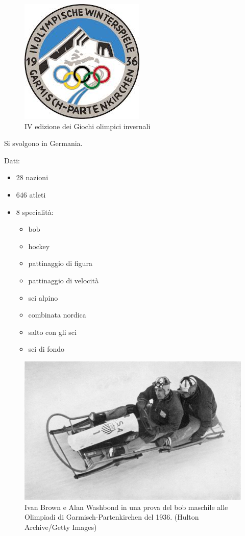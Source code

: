 \documentclass[
]{book}
\providecommand{\tightlist}{%
  \setlength{\itemsep}{0pt}\setlength{\parskip}{0pt}}
\begin{document}
\begin{figure}
\includegraphics[width=0.4\linewidth]{images/loghi/1936} \caption{IV edizione dei Giochi olimpici invernali}\label{fig:unnamed-chunk-11}
\end{figure}

Si svolgono in Germania.

Dati:

\begin{itemize}
\tightlist
\item
  28 nazioni
\item
  646 atleti
\item
  8 specialità:

  \begin{itemize}
  \tightlist
  \item
    bob
  \item
    hockey
  \item
    pattinaggio di figura
  \item
    pattinaggio di velocità
  \item
    sci alpino
  \item
    combinata nordica
  \item
    salto con gli sci
  \item
    sci di fondo
  \end{itemize}
\end{itemize}

\begin{figure}
\includegraphics[width=0.8\linewidth]{images/IlPost/1936} \caption{Ivan Brown e Alan Washbond in una prova del bob maschile alle Olimpiadi di Garmisch-Partenkirchen del 1936. (Hulton Archive/Getty Images)}\label{fig:unnamed-chunk-12}
\end{figure}
\end{document}
